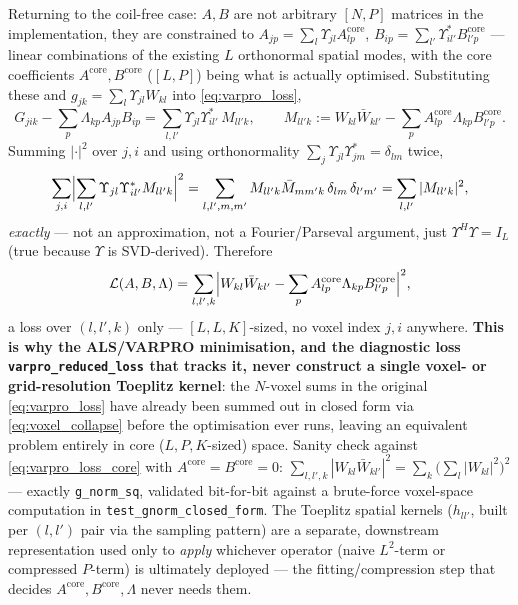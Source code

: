 \documentclass{article}
\begin{document}
Returning to the coil-free case: $A,B$ are not arbitrary $[N,P]$ matrices in the implementation,
they are
constrained to $A_{jp}=\sum_l\Upsilon_{jl}A^{\mathrm{core}}_{lp}$,
$B_{ip}=\sum_{l'}\Upsilon^*_{il'}B^{\mathrm{core}}_{l'p}$ — linear combinations of the existing
$L$ orthonormal spatial modes, with the core coefficients $A^{\mathrm{core}},B^{\mathrm{core}}$
($[L,P]$) being what is actually optimised. Substituting these and $g_{jk}=\sum_l\Upsilon_{jl}W_{kl}$
into \eqref{eq:varpro_loss},
\begin{equation}
    G_{jik} - \sum_p\Lambda_{kp}A_{jp}B_{ip}
        = \sum_{l,l'}\Upsilon_{jl}\Upsilon^*_{il'}\,M_{ll'k},
    \qquad
    M_{ll'k} := W_{kl}\bar W_{kl'} - \sum_p A^{\mathrm{core}}_{lp}\Lambda_{kp}B^{\mathrm{core}}_{l'p}.
    \label{eq:M_residual}
\end{equation}
Summing $|\cdot|^2$ over $j,i$ and using orthonormality
$\sum_j\Upsilon_{jl}\Upsilon^*_{jm}=\delta_{lm}$ twice,
\begin{equation}
    \sum_{j,i}\Bigl|\sum_{l,l'}\Upsilon_{jl}\Upsilon^*_{il'}M_{ll'k}\Bigr|^2
    = \sum_{l,l',m,m'} M_{ll'k}\bar M_{mm'k}\,\delta_{lm}\,\delta_{l'm'}
    = \sum_{l,l'}|M_{ll'k}|^2,
    \label{eq:voxel_collapse}
\end{equation}
\emph{exactly} — not an approximation, not a Fourier/Parseval argument, just $\Upsilon^H\Upsilon=I_L$
(true because $\Upsilon$ is SVD-derived). Therefore
\begin{equation}
    \mathcal{L}(A,B,\Lambda) = \sum_{l,l',k}\Bigl|W_{kl}\bar W_{kl'}
        - \sum_p A^{\mathrm{core}}_{lp}\Lambda_{kp}B^{\mathrm{core}}_{l'p}\Bigr|^2,
    \label{eq:varpro_loss_core}
\end{equation}
a loss over $(l,l',k)$ only — $[L,L,K]$-sized, no voxel index $j,i$ anywhere. \textbf{This is
why the ALS/VARPRO minimisation, and the diagnostic loss \texttt{varpro\_reduced\_loss} that
tracks it, never construct a single voxel- or grid-resolution Toeplitz kernel}: the $N$-voxel sums
in the original \eqref{eq:varpro_loss} have already been summed out in closed form via
\eqref{eq:voxel_collapse} before the optimisation ever runs, leaving an equivalent problem entirely
in core ($L,P,K$-sized) space. Sanity check against \eqref{eq:varpro_loss_core} with
$A^{\mathrm{core}}=B^{\mathrm{core}}=0$: $\sum_{l,l',k}|W_{kl}\bar W_{kl'}|^2
=\sum_k\bigl(\sum_l|W_{kl}|^2\bigr)^2$ — exactly \texttt{g\_norm\_sq}, validated bit-for-bit against
a brute-force voxel-space computation in \texttt{test\_gnorm\_closed\_form}. The Toeplitz spatial
kernels ($h_{ll'}$, built per $(l,l')$ pair via the sampling pattern) are a separate, downstream
representation used only to \emph{apply} whichever operator (naive $L^2$-term or compressed
$P$-term) is ultimately deployed — the fitting/compression step that decides $A^{\mathrm{core}},
B^{\mathrm{core}},\Lambda$ never needs them.
\end{document}
